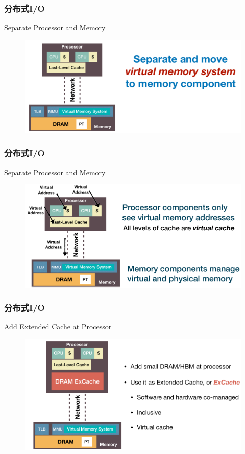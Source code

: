 \begin{frame}[fragile]
    \frametitle{分布式I/O}
   Separate Processor and Memory
    \begin{figure}
        \includegraphics[width=0.9\linewidth]{figs/disio-cpu-mem.png}
    \end{figure}
\end{frame}
\begin{frame}[fragile]
    \frametitle{分布式I/O}
    Separate Processor and Memory
    \begin{figure}
        \includegraphics[width=0.9\linewidth]{figs/disio-cpu-mem-2.png}
    \end{figure}
\end{frame}

\begin{frame}[fragile]
    \frametitle{分布式I/O}
    Add Extended Cache at Processor
    \begin{figure}
        \includegraphics[width=0.8\linewidth]{figs/disio-cpu-mem-3.png}
    \end{figure}
\end{frame}

